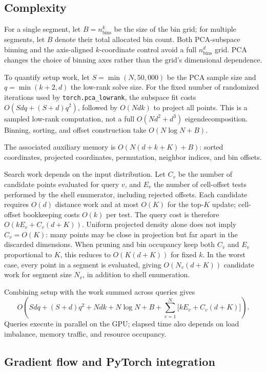 \documentclass[final,3p,11pt]{elsarticle}
\begin{document}
\vspace{-0.6em}
\subsection{Complexity}

For a single segment, let $B = n_{\text{bins}}^{k}$ be the size of the
bin grid; for multiple segments, let $B$ denote their total allocated bin
count. Both PCA-subspace binning and the axis-aligned $k$-coordinate
control avoid a full $n_{\text{bins}}^{d}$ grid. PCA changes the choice of
binning axes rather than the grid's dimensional dependence.

To quantify setup work, let $S=\min(N,50{,}000)$ be the PCA sample
size and $q=\min(k+2,d)$ the low-rank solve size. For the fixed number
of randomized iterations used by \texttt{torch.pca\_lowrank}, the
subspace fit costs $O(Sdq+(S+d)q^2)$, followed by $O(Ndk)$ to project
all points. This is a sampled low-rank computation, not a full
$O(Nd^2+d^3)$ eigendecomposition. Binning, sorting, and offset
construction take $O(N \log N + B)$.

The associated auxiliary memory is $O(N(d + k + K) + B)$:
sorted coordinates, projected coordinates, permutation, neighbor
indices, and bin offsets.

Search work depends on the input distribution. Let $C_v$ be the number of candidate
points evaluated for query $v$, and $E_v$ the number of cell-offset tests
performed by the shell enumerator, including rejected offsets. Each
candidate requires $O(d)$ distance work and at most $O(K)$ for the
top-$K$ update; cell-offset bookkeeping costs $O(k)$ per test. The query
cost is therefore $O(kE_v+C_v(d+K))$. Uniform projected density alone
does not imply $C_v=O(K)$: many points may be close in projection but far
apart in the discarded dimensions. When pruning and bin occupancy keep
both $C_v$ and $E_v$ proportional to $K$, this reduces to $O(K(d+K))$
for fixed $k$. In the worst case, every point in a segment is evaluated,
giving $O(N_v(d+K))$ candidate work for segment size $N_v$, in addition
to shell enumeration.

Combining setup with the work summed across queries gives
\[
 O\!\left(Sdq+(S+d)q^2+Ndk+N\log N+B+
 \sum_{v=1}^{N}\bigl[kE_v+C_v(d+K)\bigr]\right).
\]
Queries execute in parallel on the GPU; elapsed time also depends on
load imbalance, memory traffic, and resource occupancy.

\subsection{Gradient flow and PyTorch integration}
\end{document}
